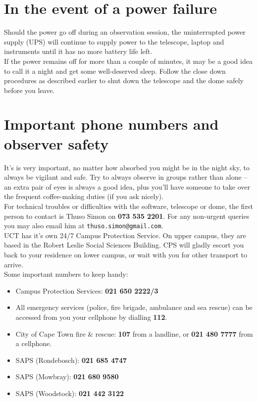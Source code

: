 \documentclass[12pt,twoside,a4paper]{report}
\begin{document}

\section{In the event of a power failure}

Should the power go off during an observation session, the uninterrupted power supply (UPS) will continue to supply power to the telescope, laptop and instruments until it has no more battery life left.\\

If the power remains off for more than a couple of minutes, it may be a good idea to call it a night and get some well-deserved sleep. Follow the close down procedures as described earlier to shut down the telescope and the dome safely before you leave.\\

\clearpage

\section{Important phone numbers and observer safety}

It's is very important, no matter how absorbed you might be in the night sky, to always be vigilant and safe. Try to always observe in groups rather than alone -- an extra pair of eyes is always a good idea, plus you'll have someone to take over the frequent coffee-making duties (if you ask nicely).\\ 

For technical troubles or difficulties with the software, telescope or dome, the first person to contact is Thuso Simon on \textbf{073 535 2201}. For any non-urgent queries you may also email him at {\tt thuso.simon@gmail.com}.\\

UCT has it's own 24/7 Campus Protection Service. On upper campus, they are based in the Robert Leslie Social Sciences Building. CPS will gladly escort you back to your residence on lower campus, or wait with you for other transport to arrive.\\

Some important numbers to keep handy:

\renewcommand{\labelitemi}{$\bullet$}
\begin{itemize}
 \item Campus Protection Services: \textbf{021 650 2222/3}
 \item All emergency services (police, fire brigade, ambulance and sea rescue) can be accessed from you your cellphone by dialling \textbf{112}.
 \item City of Cape Town fire \& rescue: \textbf{107} from a landline, or \textbf{021 480 7777} from a cellphone.
 \item SAPS (Rondebosch): \textbf{021 685 4747}
 \item SAPS (Mowbray): \textbf{021 680 9580}
 \item SAPS (Woodstock): \textbf{021 442 3122}
\end{itemize}
\end{document}
